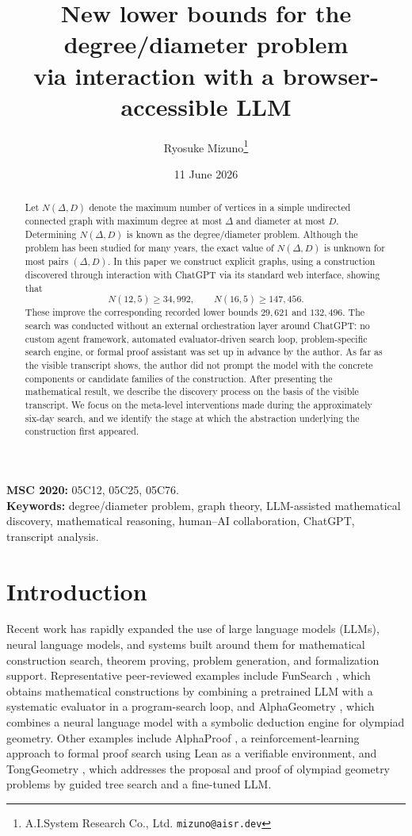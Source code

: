 \documentclass[11pt]{article}
\title{New lower bounds for the degree/diameter problem\\
       via interaction with a browser-accessible LLM}
\author{Ryosuke Mizuno\thanks{A.I.System Research Co., Ltd.\quad
        \texttt{mizuno@aisr.dev}}}
\date{11 June 2026}
\theoremstyle{definition}
\theoremstyle{remark}
\renewcommand{\_}{\textunderscore\allowbreak}
\begin{document}
\maketitle

\begin{abstract}
Let \(N(\Delta,D)\) denote the maximum number of vertices in a simple
undirected connected graph with maximum degree at most \(\Delta\) and
diameter at most \(D\). Determining \(N(\Delta,D)\) is known as the
degree/diameter problem. Although the problem has been studied for many
years, the exact value of \(N(\Delta,D)\) is unknown for most pairs
\((\Delta,D)\). In this paper we construct explicit graphs, using a
construction discovered through interaction with
ChatGPT via its standard web interface, showing that \[
  N(12,5)\ge 34{,}992,\qquad
  N(16,5)\ge 147{,}456 .
\] These improve the corresponding recorded lower bounds \(29{,}621\)
and \(132{,}496\). The search was conducted without an external orchestration layer around
ChatGPT: no custom agent framework, automated evaluator-driven search
loop, problem-specific search engine, or formal proof assistant was set
up in advance by the author. As far as the visible
transcript shows, the author did not prompt the model with the concrete
components or candidate families of the construction.
After presenting the mathematical result, we describe the discovery
process on the basis of the visible transcript. We focus on the
meta-level interventions made during the approximately six-day search,
and we identify the stage at which the abstraction underlying the
construction first appeared.
\end{abstract}

\medskip
\noindent\textbf{MSC 2020:} 05C12, 05C25, 05C76.\\
\textbf{Keywords:} degree/diameter problem, graph theory, LLM-assisted
mathematical discovery, mathematical reasoning, human--AI collaboration,
ChatGPT, transcript analysis.


\section{Introduction}\label{introduction}

Recent work has rapidly expanded the use of large language models
(LLMs), neural language models, and systems built around them for
mathematical construction search, theorem proving, problem generation,
and formalization support. Representative peer-reviewed examples include
FunSearch \cite{RomeraParedes2024}, which obtains mathematical
constructions by combining a pretrained LLM with a systematic evaluator
in a program-search loop, and AlphaGeometry \cite{Trinh2024}, which
combines a neural language model with a symbolic deduction engine for
olympiad geometry. Other examples include AlphaProof \cite{Hubert2026}, a
reinforcement-learning approach to formal proof search using Lean as a
verifiable environment, and TongGeometry \cite{Zhang2026}, which
addresses the proposal and proof of olympiad geometry problems by guided
tree search and a fine-tuned LLM.
\end{document}
